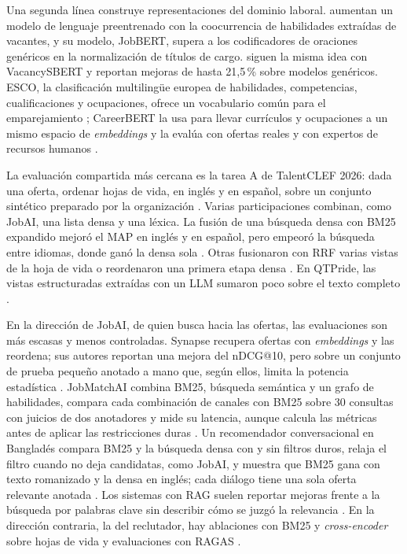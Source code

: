 Una segunda línea construye representaciones del dominio laboral. \citet{Decorte2021} aumentan un modelo de lenguaje preentrenado con la coocurrencia de habilidades extraídas de vacantes, y su modelo, JobBERT, supera a los codificadores de oraciones genéricos en la normalización de títulos de cargo. \citet{Bocharova2023} siguen la misma idea con VacancySBERT y reportan mejoras de hasta 21,5\,\% sobre modelos genéricos. ESCO, la clasificación multilingüe europea de habilidades, competencias, cualificaciones y ocupaciones, ofrece un vocabulario común para el emparejamiento \citep{leVrang2014}; CareerBERT la usa para llevar currículos y ocupaciones a un mismo espacio de \textit{embeddings} y la evalúa con ofertas reales y con expertos de recursos humanos \citep{Rosenberger2025}.

La evaluación compartida más cercana es la tarea A de TalentCLEF 2026: dada una oferta, ordenar hojas de vida, en inglés y en español, sobre un conjunto sintético preparado por la organización \citep{Fabregat2026}. Varias participaciones combinan, como JobAI, una lista densa y una léxica. La fusión de una búsqueda densa con BM25 expandido mejoró el MAP en inglés y en español, pero empeoró la búsqueda entre idiomas, donde ganó la densa sola \citep{Thuma2026}. Otras fusionaron con RRF varias vistas de la hoja de vida \citep{Poerwanto2026,Tran2026QTPride} o reordenaron una primera etapa densa \citep{Palomino2026}. En QTPride, las vistas estructuradas extraídas con un LLM sumaron poco sobre el texto completo \citep{Tran2026QTPride}.

En la dirección de JobAI, de quien busca hacia las ofertas, las evaluaciones son más escasas y menos controladas. Synapse recupera ofertas con \textit{embeddings} y las reordena; sus autores reportan una mejora del nDCG@10, pero sobre un conjunto de prueba pequeño anotado a mano que, según ellos, limita la potencia estadística \citep{Erol2026}. JobMatchAI combina BM25, búsqueda semántica y un grafo de habilidades, compara cada combinación de canales con BM25 sobre 30 consultas con juicios de dos anotadores y mide su latencia, aunque calcula las métricas antes de aplicar las restricciones duras \citep{Vyas2026}. Un recomendador conversacional en Bangladés compara BM25 y la búsqueda densa con y sin filtros duros, relaja el filtro cuando no deja candidatas, como JobAI, y muestra que BM25 gana con texto romanizado y la densa en inglés; cada diálogo tiene una sola oferta relevante anotada \citep{Hossain2026}. Los sistemas con RAG suelen reportar mejoras frente a la búsqueda por palabras clave sin describir cómo se juzgó la relevancia \citep{Yoruk2025,Srihari2025JobSphere}. En la dirección contraria, la del reclutador, hay ablaciones con BM25 y \textit{cross-encoder} sobre hojas de vida \citep{Julianto2026} y evaluaciones con RAGAS \citep{Tran2025}.

